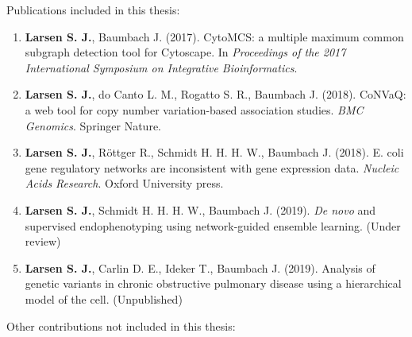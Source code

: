 Publications included in this thesis:
\begin{enumerate}
    \item \textbf{Larsen S. J.}, Baumbach J. (2017). CytoMCS: a multiple maximum common subgraph detection tool for Cytoscape. In \emph{Proceedings of the 2017 International Symposium on Integrative Bioinformatics}.
    \item \textbf{Larsen S. J.}, do Canto L. M., Rogatto S. R., Baumbach J. (2018). \mbox{CoNVaQ}: a web tool for copy number variation-based association studies. \emph{BMC Genomics}. Springer Nature.
	\item \textbf{Larsen S. J.}, R\"ottger R., Schmidt H. H. H. W., Baumbach J. (2018). E. coli gene regulatory networks are inconsistent with gene expression data. \emph{Nucleic Acids Research}. Oxford University press.
    \item \textbf{Larsen S. J.}, Schmidt H. H. H. W., Baumbach J. (2019). \emph{De novo} and supervised endophenotyping using network-guided ensemble learning. (Under review)
    \item \textbf{Larsen S. J.}, Carlin D. E., Ideker T., Baumbach J. (2019). Analysis of genetic variants in chronic obstructive pulmonary disease using a hierarchical model of the cell. (Unpublished)
\end{enumerate}
Other contributions not included in this thesis:
